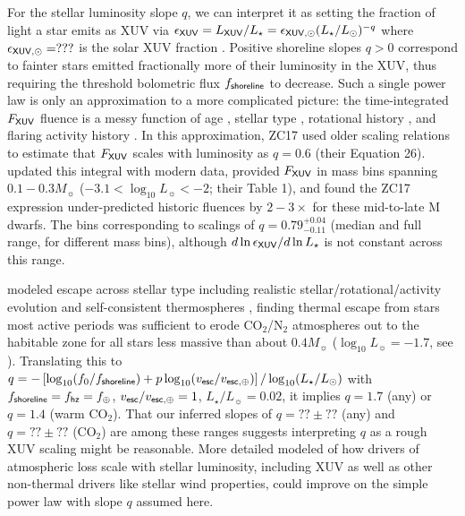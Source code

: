 \documentclass[modern,linenumbers,trackchanges]{aastex7}
\begin{document}
For the stellar luminosity slope $q$, we can interpret it as setting the fraction of light a star emits as XUV via $\epsilon_{\sf XUV} = L_{\sf XUV}/L_{\star} = \epsilon_{\sf XUV, \odot} (L_\star/L_\odot)^{-q}$ where $\epsilon_{\sf XUV, \odot}=???$ is the solar XUV fraction \citep{woodsSolarIrradianceReference2009a}. Positive shoreline slopes $q > 0$ correspond to fainter stars emitted fractionally more of their luminosity in the XUV, thus requiring the threshold bolometric flux $f_{\sf shoreline}$ to decrease. Such a single power law is only an approximation to a more complicated picture: the time-integrated $F_{\sf XUV}$ fluence is a messy function of age \citep{ribasEvolutionSolarActivity2005, wrightSTELLARACTIVITYROTATIONRELATIONSHIPEVOLUTION2011, pinedaFarUltravioletMdwarf2021, duvvuriHighenergySpectrumYoung2023b, kingStellarXRayVariability2025}, stellar type \citep{linskyIntrinsicExtremeUltraviolet2014, richey-yowellHAZMATUltravioletXRay2019, peacockHAZMATVIEvolution2020, wilsonMegaMUSCLESTreasurySurvey2025b}, rotational history \citep{irwinMonitorProjectRotation2007, loydHAZMATVIIEvolution2021, johnstoneActiveLivesStars2021}, and flaring activity history  \citep{franceHighenergyRadiationEnvironment2020d, diamond-loweHighenergySpectrumNearby2021a, feinsteinAUMicroscopiiFarUV2022a}. In this approximation, ZC17 used older scaling relations to estimate that $F_{\sf XUV}$ scales with luminosity as $q=0.6$ (their Equation 26). \citet{passRecedingCosmicShoreline2025} updated this integral with modern data, provided $F_{\sf XUV}$ in mass bins spanning $0.1-0.3 M_\sun$ ($-3.1< \log_{10} L_\sun < -2$; their Table 1), and found the ZC17 expression under-predicted historic fluences by $2-3\times$ for these mid-to-late M dwarfs. The \citet{passRecedingCosmicShoreline2025} bins corresponding to scalings of $q={0.79}^{+0.04}_{-0.11}$ (median and full range, for different mass bins), although $d\ln \epsilon_{\sf XUV}/d\ln L_\star$ is not constant across this range. 

\citet{vanlooverenHabitableZoneAtmosphere2025} modeled escape across stellar type including realistic stellar/rotational/activity evolution and self-consistent thermospheres \citep{johnstoneUpperAtmospheresTerrestrial2018}, finding thermal escape from stars most active periods was sufficient to erode CO$_2$/N$_2$ atmospheres out to the habitable zone for all stars less massive than about $0.4 M_\sun$ ($\log_{10} L_\sun =-1.7$, see \citealt{pinedaMdwarfUltravioletSpectroscopic2021}). Translating this to $q = - \left[\log_{10} (f_0/f_{\sf shoreline}) + p \log_{10} (v_{\sf esc}/v_{\sf esc, \oplus})\right]/\log_{10} (L_\star/L_\odot)$ with $f_{\sf shoreline} = f_{\sf hz} = f_{\oplus}$, $v_{\sf esc}/v_{\sf esc, \oplus}=1$, $L_\star/L_\sun = 0.02$, it implies $q = 1.7$ (any) or $q = 1.4$ (warm CO$_2$). That our inferred slopes of $q = ??\pm??$ (any) and $q = ??\pm??$ (CO$_2$) are among these ranges suggests interpreting $q$ as a rough XUV scaling might be reasonable. More detailed modeled of how drivers of atmospheric loss scale with stellar luminosity, including XUV as well as other non-thermal drivers like stellar wind properties, could improve on the simple power law with slope $q$ assumed here.
\end{document}

